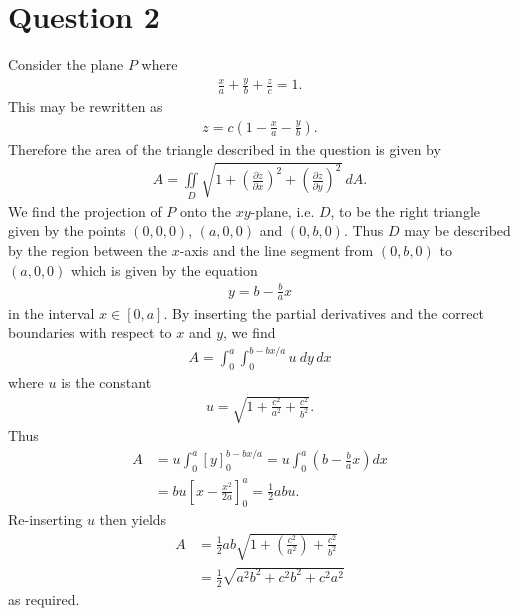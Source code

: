 \documentclass{article}
\newcommand{\di}{\iint\limits}
\begin{document}
\section*{Question 2}
Consider the plane $P$ where
\begin{align*}
  \frac{x}{a}+\frac{y}{b}+\frac{z}{c}=1.
\end{align*}
This may be rewritten as
\begin{align*}
  z=c\left(1-\frac{x}{a}-\frac{y}{b}\right).
\end{align*}
Therefore the area of the triangle described in the question is given by
\begin{align*}
  A = \di_D \sqrt{1 + \left(\frac{\partial z}{\partial x}\right)^2+\left(\frac{\partial z}{\partial y}\right)^2}\:dA.
\end{align*}
We find the projection of $P$ onto the $xy$-plane, i.e. $D$, to be the right triangle
given by the points $(0,0,0)$, $(a,0,0)$ and $(0,b,0)$.
Thus $D$ may be described by the region between the $x$-axis and the line segment from $(0,b,0)$ to
$(a,0,0)$ which is given by the equation
\begin{align*}
  y = b-\frac{b}{a}x
\end{align*}
in the interval $x\in[0,a]$.
By inserting the partial derivatives and the correct boundaries with respect to
$x$ and $y$, we find
\begin{align*}
  A = \int_0^a \int_0^{b-bx/a}u\:dy\,dx
\end{align*}
where $u$ is the constant
\begin{align*}
  u = \sqrt{1+\frac{c^2}{a^2}+\frac{c^2}{b^2}}.
\end{align*}
Thus 
\begin{align*}
  A &= u\int_0^a [y]_0^{b-bx/a}=u\int_0^a\left(b - \frac{b}{a}x\right)dx\\
  &= bu \left[x-\frac{x^2}{2a}\right]_0^a = \frac{1}{2}abu.
\end{align*}
Re-inserting $u$ then yields
\begin{align*}
  A &= \frac{1}{2}ab\sqrt{1+\left(\frac{c^2}{a^2}\right)+\frac{c^2}{b^2}}\\
  &= \frac{1}{2}\sqrt{a^2b^2+c^2b^2+c^2a^2}
\end{align*}
as required.
\end{document}

